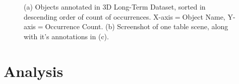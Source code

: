 \documentclass[letterpaper, 10 pt, conference]{ieeeconf}  %
\begin{document}
\begin{figure}[t]
\begin{center}
\\
\\
\caption{(a) Objects annotated in 3D Long-Term Dataset, sorted in descending order of count of occurrences. X-axis$=$Object Name, Y-axis$=$Occurrence Count. (b) Screenshot of one table scene, along with it's annotations in (c).}
\end{center}
\end{figure}


\section{Analysis}
\label{sec:Analysis}
\end{document}
